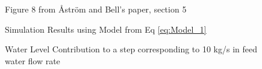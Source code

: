        \begin{figure}[ht]
            \begin{center}
                
                Figure 8 from \r{A}str\"{o}m and Bell's paper, section 5 \cite{Astrom}
                
                
                Simulation Results using Model from Eq \eqref{eq:Model_1}
                
                \caption{Water Level Contribution to a step corresponding to 10 kg/s in feed water flow rate}
                \label{fig:Fig8B}
            \end{center}
        \end{figure}  %
